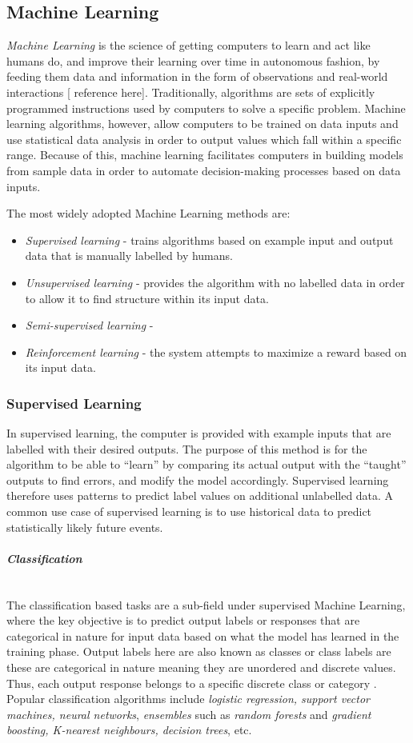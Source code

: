 \documentclass[12pt,a4paper]{article}
\newcommand{\myparagraph}[1]{\paragraph{#1}\mbox{}\\}
\begin{document}
\subsection{Machine Learning}
\textit{Machine Learning} is the science of getting computers to learn and act like humans do, and improve their learning over time in autonomous fashion, by feeding them data and information in the form of observations and real-world interactions [ reference here]. Traditionally, algorithms are sets of explicitly programmed instructions used by computers to solve a specific problem. Machine learning algorithms, however, allow computers to be trained on data inputs and use statistical data analysis in order to output values which fall within a specific range. Because of this, machine learning facilitates computers in building models from sample data in order to automate decision-making processes based on data inputs.

The most widely adopted Machine Learning methods are:
\begin{itemize}
    \item \textit{Supervised learning} - trains algorithms based on example input and output data that is manually labelled by humans.
    \item \textit{Unsupervised learning} - provides the algorithm with no labelled data in order to allow it to find structure within its input data.
    \item \textit{Semi-supervised learning} -
    \item \textit{Reinforcement learning} - the system attempts to maximize a reward based on its input data.
\end{itemize}

\subsubsection{Supervised Learning}
In supervised learning, the computer is provided with example inputs that are labelled with their desired outputs. The purpose of this method is for the algorithm to be able to “learn” by comparing its actual output with the “taught” outputs to find errors, and modify the model accordingly. Supervised learning therefore uses patterns to predict label values on additional unlabelled data. A common use case of supervised learning is to use historical data to predict statistically likely future events.

\myparagraph{\textit{Classification}}
The classification based tasks are a sub-field under supervised Machine Learning, where the key objective
is to predict output labels or responses that are categorical in nature for input data based on what the model
has learned in the training phase. Output labels here are also known as classes or class labels are these are
categorical in nature meaning they are unordered and discrete values. Thus, each output response belongs
to a specific discrete class or category \cite{Kononenko2007}.
Popular classification algorithms include \textit{logistic regression, support vector machines, neural networks},
\textit{ensembles} such as \textit{random forests} and \textit{gradient boosting, K-nearest neighbours, decision trees}, etc.
\end{document}
